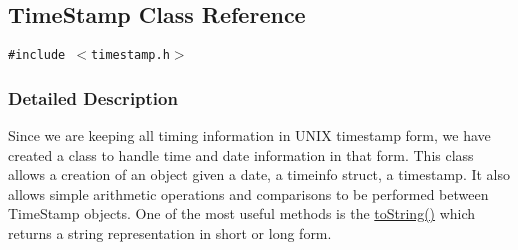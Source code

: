 \hypertarget{classTimeStamp}{
\subsection{Time\-Stamp Class Reference}
\label{classTimeStamp}
}
{\tt \#include $<$timestamp.h$>$}



\subsubsection{Detailed Description}
Since we are keeping all timing information in UNIX timestamp form, we have created a class to handle time and date information in that form. This class allows a creation of an object given a date, a timeinfo struct, a timestamp. It also allows simple arithmetic operations and comparisons to be performed between Time\-Stamp objects. One of the most useful methods is the \hyperlink{classTimeStamp_TimeStampa20}{to\-String()} which returns a string representation in short or long form. 



